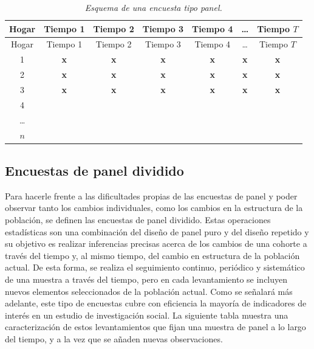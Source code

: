 \documentclass[
  12pt,
  spanish,
]{book}
\begin{document}
\begin{longtable}[]{@{}ccccccc@{}}
\caption{\emph{Esquema de una encuesta tipo panel.}}\tabularnewline
\toprule
Hogar & Tiempo 1 & Tiempo 2 & Tiempo 3 & Tiempo 4 & \ldots{} & Tiempo \(T\) \\
\midrule
\endfirsthead
\toprule
Hogar & Tiempo 1 & Tiempo 2 & Tiempo 3 & Tiempo 4 & \ldots{} & Tiempo \(T\) \\
\midrule
\endhead
1 & \textbf{x} & \textbf{x} & \textbf{x} & \textbf{x} & \textbf{x} & \textbf{x} \\
2 & \textbf{x} & \textbf{x} & \textbf{x} & \textbf{x} & \textbf{x} & \textbf{x} \\
3 & \textbf{x} & \textbf{x} & \textbf{x} & \textbf{x} & \textbf{x} & \textbf{x} \\
4 & & & & & & \\
\ldots{} & & & & & & \\
\(n\) & & & & & & \\
\bottomrule
\end{longtable}

\hypertarget{encuestas-de-panel-dividido}{%
\subsection{Encuestas de panel dividido}\label{encuestas-de-panel-dividido}}

Para hacerle frente a las dificultades propias de las encuestas de panel y poder observar tanto los cambios individuales, como los cambios en la estructura de la población, se definen las encuestas de panel dividido. Estas operaciones estadísticas son una combinación del diseño de panel puro y del diseño repetido y su objetivo es realizar inferencias precisas acerca de los cambios de una cohorte a través del tiempo y, al mismo tiempo, del cambio en estructura de la población actual. De esta forma, se realiza el seguimiento continuo, periódico y sistemático de una muestra a través del tiempo, pero en cada levantamiento se incluyen nuevos elementos seleccionados de la población actual. Como se señalará más adelante, este tipo de encuestas cubre con eficiencia la mayoría de indicadores de interés en un estudio de investigación social. La siguiente tabla muestra una caracterización de estos levantamientos que fijan una muestra de panel a lo largo del tiempo, y a la vez que se añaden nuevas observaciones.
\end{document}
